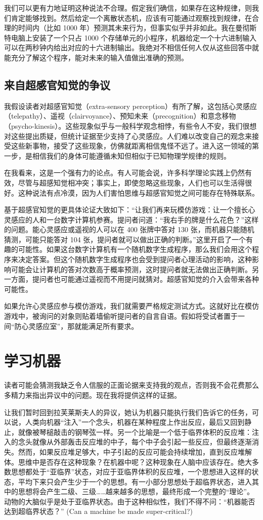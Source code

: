 \documentclass[12pt,a4paper,twoside]{article}
\begin{document}
我们可以更有力地证明这种说法不合理。假定我们确信，如果存在这种规律，则我们肯定能够找到。然后给定一个离散状态机，应该有可能通过观察找到规律，在合理的时间内（比如 1000 年）预测其未来行为，但事实似乎并非如此。我在曼彻斯特电脑上安装了一个只占 1000 个存储单元的小程序，机器给定一个十六进制输入可以在两秒钟内给出对应的十六进制输出。我绝对不相信任何人仅从这些回答中就能充分了解这个程序，能对未来的输入值做出准确的预测。

\subsection{来自超感官知觉的争议}
我假设读者对超感官知觉（extra-sensory perception）有所了解，这包括心灵感应（telepathy）、遥视（clairvoyance）、预知未来（precognition）和意念移物（psycho-kinesis）。这些现象似乎与一般科学观念相悖，有些令人不安，我们很想对这些提出质疑，但统计证据至少支持了心灵感应。人们难以改变自己的观念来接受这些新事物，接受了这些现象，仿佛就距离相信鬼怪不远了。进入这一领域的第一步，是相信我们的身体可能遵循未知但相似于已知物理学规律的规则。

在我看来，这是一个强有力的论点。有人可能会说，许多科学理论实践上仍然有效，尽管与超感知觉相冲突；事实上，即使忽略这些现象，人们也可以生活得很好。这种说法有点冷漠，因为人们害怕思维与超感官知觉之间可能存在特殊联系。

基于超感官知觉的更具体论证大致如下：“让我们再来玩模仿游戏：让一个擅长心灵感应的人和一台数字计算机参赛。提问者问道：“我右手的牌是什么花色？”这样的问题。能心灵感应或遥视的人可以在 400 张牌中答对 130 张，而机器只能随机猜测，可能只能答对 104 张，提问者就可以做出正确的判断。”这里开启了一个有趣的可能性。如果这台数字计算机有一个随机数字生成程序，那么我们会用这个程序来决定答案。但这个随机数字生成程序也会受到提问者心理活动的影响，这种影响可能会让计算机的答对次数高于概率预测，这时提问者就无法做出正确判断。另一方面，提问者也可能通过遥视而不用提问就猜对。超感官知觉的介入会带来各种可能性。

如果允许心灵感应参与模仿游戏，我们就需要严格规定测试方式。这就好比在模仿游戏中，被询问的对象则贴着墙偷听提问者的自言自语。假如将受试者置于一间“防心灵感应室”，那就能满足所有要求。

\section{学习机器}
读者可能会猜测我缺乏令人信服的正面论据来支持我的观点，否则我不会花费那么多精力来指出异议中的问题。现在我将提供这样的证据。

让我们暂时回到拉芙莱斯夫人的异议，她认为机器只能执行我们告诉它的任务，可以说，人类向机器“注入”一个念头，机器在某种程度上作出反应，最后又回到静止，就像被琴槌敲击的钢琴弦一样。另一个比喻是一个低于临界体积的反应堆：注入的念头就像从外部轰击反应堆的中子，每个中子会引起一些反应，但最终逐渐消失。然而，如果反应堆足够大，中子引起的反应可能会持续增加，直到反应堆解体。思维中是否存在这种现象？在机器中呢？这种现‍‍象在人脑中应该存在。绝大多数思想都处于“亚临界”状态，对应于亚临界体积的反应堆，一个思想进入这样的状态，平均下来只会产生少于一个的思想。有一小部分思想处于超临界状态，进入其中的思想将会产生二级、三级……越来越多的思想，最终形成一个完整的“理论”。动物的大脑似乎是处于亚临界状态。由于这种相似性，我们不得不问：“机器能否达到超临界状态？” (Can a machine be made super-critical?)
\end{document}
